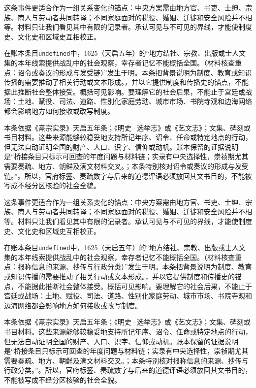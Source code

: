 这条事件更适合作为一组关系变化的锚点：中央方案需由地方官、书吏、士绅、宗族、商人与劳动者共同转译；不同家庭面对的税役、婚姻、迁徙和安全风险并不相等。材料只让我们看见其中有限的记录者。承认可见与不可见的界线，才能使制度史、文化史和区域史互相校正。

在账本条目\texttt{undefined}中，1625（天启五年）的“地方结社、宗教、出版或士人文集的本年线索提供战乱中的社会观察，幸存者记忆不能概括全国。（材料核查重点：诏令或奏议的形成与发受链）”发生于明。本条把背景说明为制度、教育或知识传播的需要推动了相关行动或文本形成。，并以它提供制度和传播史的锚点，不能据此推断社会整体接受。概括可见影响。要理解它的社会后果，不能止于宫廷或战场：土地、赋役、司法、道路、性别化家庭劳动、城市市场、书院寺观和边海网络都会影响地方如何接收或改写制度。

本条依据《熹宗实录》天启五年条；《明史·选举志》或《艺文志》；文集、碑刻或书目材料。这些来源能够较稳妥地支持所记年序、诏令、任命或特定地点的行动，但无法自动证明全国的财产、人口、识字、信仰或动机。账本保留的证据说明是“桥接条目只标示可回查的年度问题与材料链；实录有中央选择性，崇祯期尤其需要奏疏、地方、朝鲜及满文材料交叉。；本条特别核对诏令或奏议的形成与发受链。”。所以，官府标签、奏疏数字与后来的道德评语必须放回其文书目的，不能被写成不经分区核验的社会全貌。

这条事件更适合作为一组关系变化的锚点：中央方案需由地方官、书吏、士绅、宗族、商人与劳动者共同转译；不同家庭面对的税役、婚姻、迁徙和安全风险并不相等。材料只让我们看见其中有限的记录者。承认可见与不可见的界线，才能使制度史、文化史和区域史互相校正。

在账本条目\texttt{undefined}中，1625（天启五年）的“地方结社、宗教、出版或士人文集的本年线索提供战乱中的社会观察，幸存者记忆不能概括全国。（材料核查重点：报称信息的来源、抄传与行政分类）”发生于明。本条把背景说明为制度、教育或知识传播的需要推动了相关行动或文本形成。，并以它提供制度和传播史的锚点，不能据此推断社会整体接受。概括可见影响。要理解它的社会后果，不能止于宫廷或战场：土地、赋役、司法、道路、性别化家庭劳动、城市市场、书院寺观和边海网络都会影响地方如何接收或改写制度。

本条依据《熹宗实录》天启五年条；《明史·选举志》或《艺文志》；文集、碑刻或书目材料。这些来源能够较稳妥地支持所记年序、诏令、任命或特定地点的行动，但无法自动证明全国的财产、人口、识字、信仰或动机。账本保留的证据说明是“桥接条目只标示可回查的年度问题与材料链；实录有中央选择性，崇祯期尤其需要奏疏、地方、朝鲜及满文材料交叉。；本条特别核对报称信息的来源、抄传与行政分类。”。所以，官府标签、奏疏数字与后来的道德评语必须放回其文书目的，不能被写成不经分区核验的社会全貌。

